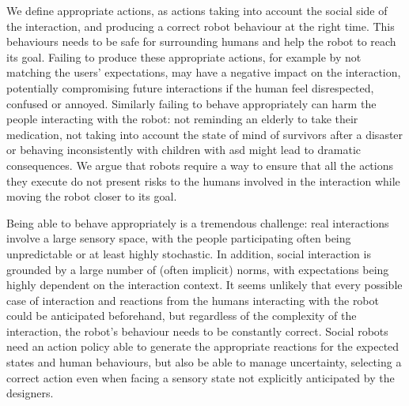     We define appropriate actions, as actions taking into account the social side of the interaction, and producing a correct robot behaviour at the right time. This behaviours needs to be safe for surrounding humans and help the robot to reach its goal. Failing to produce these appropriate actions, for example by not matching the users' expectations, may have a negative impact on the interaction, potentially compromising future interactions if the human feel disrespected, confused or annoyed. Similarly failing to behave appropriately can harm the people interacting with the robot: not reminding an elderly to take their medication, not taking into account the state of mind of survivors after a disaster or behaving inconsistently with children with \gls{asd} might lead to dramatic consequences.  We argue that robots require a way to ensure that all the actions they execute do not present risks to the humans involved in the interaction while moving the robot closer to its goal.
	
    
    Being able to behave appropriately is a tremendous challenge: real interactions involve a large sensory space, with the people participating often being unpredictable or at least highly stochastic. In addition, social interaction is grounded by a large number of (often implicit) norms, with expectations being highly dependent on the interaction context. It seems unlikely that every possible case of interaction and reactions from the humans interacting with the robot could be anticipated beforehand, but regardless of the complexity of the interaction, the robot's behaviour needs to be constantly correct. Social robots need an action policy able to generate the appropriate reactions for the expected states and human behaviours, but also be able to manage uncertainty, selecting a correct action even when facing a sensory state not explicitly anticipated by the designers.
    
